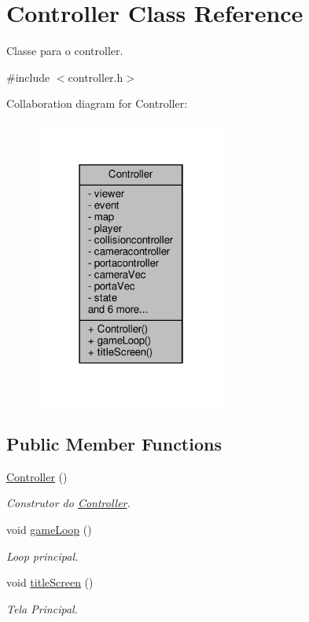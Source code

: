 \hypertarget{classController}{}\section{Controller Class Reference}
\label{classController}


Classe para o controller.  




{\ttfamily \#include $<$controller.\+h$>$}



Collaboration diagram for Controller\+:
\nopagebreak
\begin{figure}[H]
\begin{center}
\leavevmode
\includegraphics[width=178pt]{classController__coll__graph}
\end{center}
\end{figure}
\subsection*{Public Member Functions}
\begin{DoxyCompactItemize}
\item 
\hyperlink{classController_a95c56822d667e94b031451729ce069a9}{Controller} ()
\begin{DoxyCompactList}\small\item\em Construtor do \hyperlink{classController}{Controller}. \end{DoxyCompactList}\item 
void \hyperlink{classController_a31ede2d3d9dba71913635bfe025b443d}{game\+Loop} ()
\begin{DoxyCompactList}\small\item\em Loop principal. \end{DoxyCompactList}\item 
void \hyperlink{classController_a18960c9e5f51f4844d51d27fb394ff85}{title\+Screen} ()
\begin{DoxyCompactList}\small\item\em Tela Principal. \end{DoxyCompactList}\end{DoxyCompactItemize}
